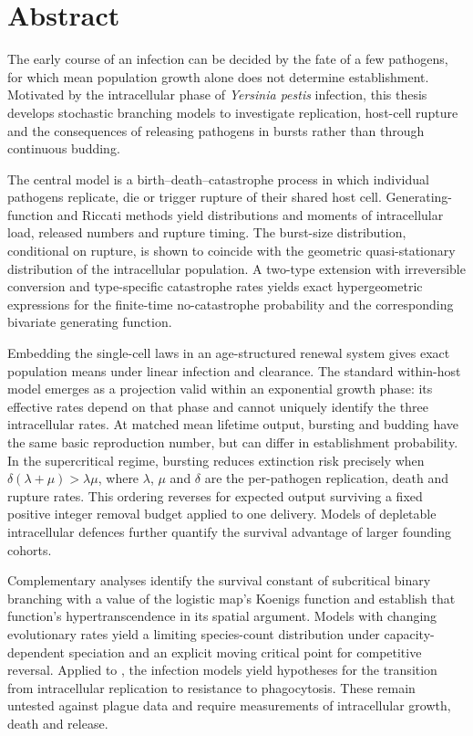 \chapter*{\centering Abstract}
\label{sup:abstract}

The early course of an infection can be decided by the fate of a few
pathogens, for which mean population growth alone does not determine
establishment. Motivated by the intracellular phase of
\textit{Yersinia pestis} infection, this thesis develops stochastic
branching models to investigate replication, host-cell rupture and the
consequences of releasing pathogens in bursts rather than through
continuous budding.

The central model is a birth--death--catastrophe process in which
individual pathogens replicate, die or trigger rupture of their shared
host cell. Generating-function and Riccati methods yield distributions
and moments of intracellular load, released numbers and rupture timing.
The burst-size distribution, conditional on rupture, is shown to
coincide with the geometric quasi-stationary distribution of the
intracellular population. A two-type extension with irreversible
conversion and type-specific catastrophe rates yields exact
hypergeometric expressions for the finite-time no-catastrophe
probability and the corresponding bivariate generating function.

Embedding the single-cell laws in an age-structured renewal system
gives exact population means under linear infection and clearance. The
standard within-host model emerges as a projection valid within an
exponential growth phase: its effective rates depend on that phase and
cannot uniquely identify the three intracellular rates. At matched mean
lifetime output, bursting and budding have the same basic reproduction
number, but can differ in establishment probability. In the
supercritical regime, bursting reduces extinction risk precisely when
$\delta(\lambda+\mu)>\lambda\mu$, where $\lambda$, $\mu$ and $\delta$
are the per-pathogen replication, death and rupture rates. This
ordering reverses for expected output surviving a fixed positive
integer removal budget applied to one delivery. Models of depletable
intracellular defences further quantify the survival advantage of
larger founding cohorts.

Complementary analyses identify the survival constant of subcritical
binary branching with a value of the logistic map's Koenigs function
and establish that function's hypertranscendence in its spatial
argument. Models with changing evolutionary rates yield a limiting
species-count distribution under capacity-dependent speciation and an
explicit moving critical point for competitive reversal. Applied to
\yp{}, the infection models yield hypotheses for the transition from
intracellular replication to resistance to phagocytosis. These remain
untested against plague data and require measurements of intracellular
growth, death and release.

